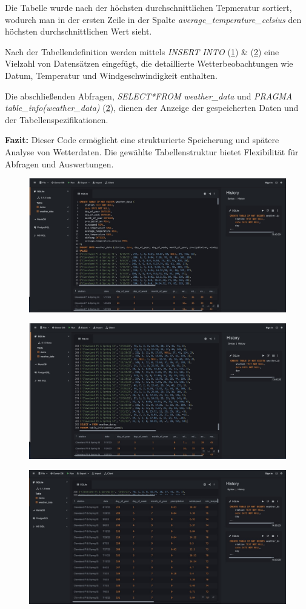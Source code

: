 \documentclass{article}
\begin{document}
Die Tabelle wurde nach der höchsten durchschnittlichen Tepmeratur sortiert, wodurch man in der ersten Zeile in der Spalte \textit{average\_temperature\_celsius} den höchsten durchschnittlichen Wert sieht.

Nach der Tabellendefinition werden mittels \textit{INSERT INTO} (\ref{Abb1}) \& (\ref{Abb2}) eine Vielzahl von Datensätzen eingefügt, die detaillierte Wetterbeobachtungen wie Datum, Temperatur und Windgeschwindigkeit enthalten.

Die abschließenden Abfragen, \textit{SELECT*FROM weather\_data} und \textit{PRAGMA  table\_info(weather\_data)} (\ref{Abb2}), dienen der Anzeige der gespeicherten Daten und der Tabellenspezifikationen.

\textbf{Fazit:} Dieser Code ermöglicht eine strukturierte Speicherung und spätere Analyse von Wetterdaten. Die gewählte Tabellenstruktur bietet Flexibilität für Abfragen und Auswertungen. 



\begin{figure}[p]
    \centering
    \includegraphics[width=0.5\linewidth]{Bild1.jpeg}
    \caption{}
    \label{Abb1}
\end{figure}

\begin{figure}
    \centering
    \includegraphics[width=0.5\linewidth]{Bild2.jpeg}
    \caption{}
    \label{Abb2}
\end{figure}

\begin{figure}
    \centering
    \includegraphics[width=0.5\linewidth]{Bild3.jpeg}
    \caption{}
    \label{Abb3}
\end{figure}
\end{document}
